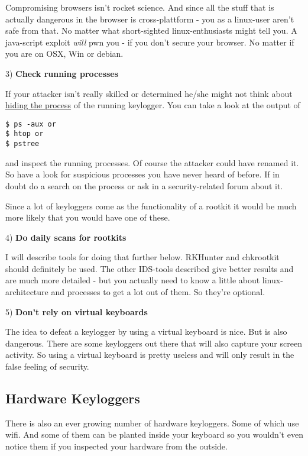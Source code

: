 \documentclass{article}
\begin{document}
 Compromising browsers isn't rocket science. And since all the stuff that is actually dangerous in the browser is cross-plattform - you as a linux-user aren't safe from that. No matter what short-sighted linux-enthusiasts might tell you. A java-script exploit \emph{will} pwn you - if you don't secure your browser. No matter if you are on OSX, Win or debian. 


 3) \textbf{Check running processes}


 If your attacker isn't really skilled or determined he/she might not think about \href{http://unix.stackexchange.com/questions/17164/how-to-make-a-process-invisible-to-other-users}{hiding the process} of the running keylogger. You can take a look at the output of 
\begin{lstlisting}
$ ps -aux or
$ htop or
$ pstree
\end{lstlisting}



 and inspect the running processes. Of course the attacker could have renamed it. So have a look for suspicious processes you have never heard of before. If in doubt do a search on the process or ask in a security-related forum about it. 


 Since a lot of keyloggers come as the functionality of a rootkit it would be much more likely that you would have one of these. 


 4) \textbf{Do daily scans for rootkits}


 I will describe tools for doing that further below. RKHunter and chkrootkit should definitely be used. The other IDS-tools described give better results and are much more detailed - but you actually need to know a little about linux-architecture and processes to get a lot out of them. So they're optional.


 5) \textbf{Don't rely on virtual keyboards} 


 The idea to defeat a keylogger by using a virtual keyboard is nice. But is also dangerous. There are some keyloggers out there that will also capture your screen activity. So using a virtual keyboard is pretty useless and will only result in the false feeling of security.
\subsection{Hardware Keyloggers}


 There is also an ever growing number of hardware keyloggers. Some of which use wifi. And some of them can be planted inside your keyboard so you wouldn't even notice them if you inspected your hardware from the outside. 
\end{document}
